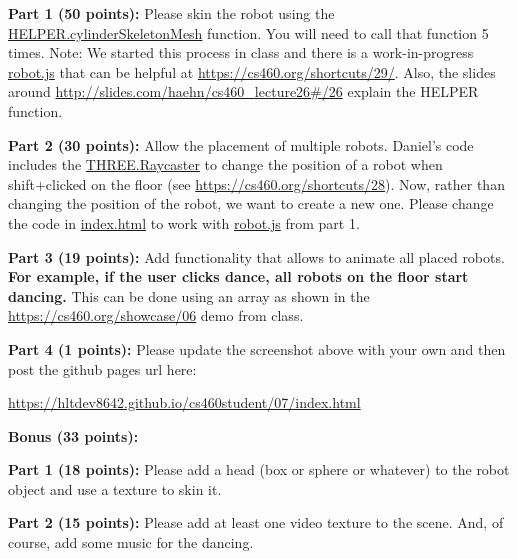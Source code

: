 \documentclass[10pt,oneside,onecolumn,letterpaper]{article}
\begin{document}
\vspace{.5cm}


\noindent\textbf{Part 1 (50 points):} Please skin the robot using the \url{HELPER.cylinderSkeletonMesh} function. You will need to call that function 5 times. Note: We started this process in class and there is a work-in-progress \url{robot.js} that can be helpful at \url{https://cs460.org/shortcuts/29/}. Also, the slides around \url{http://slides.com/haehn/cs460_lecture26#/26} explain the HELPER function.

\vspace{.5cm}

\noindent\textbf{Part 2 (30 points):} Allow the placement of multiple robots. Daniel's code includes the \url{THREE.Raycaster} to change the position of a robot when shift+clicked on the floor (see \url{https://cs460.org/shortcuts/28}). Now, rather than changing the position of the robot, we want to create a new one. Please change the code in \url{index.html} to work with \url{robot.js} from part 1.

\vspace{.5cm}

\noindent\textbf{Part 3 (19 points):} Add functionality that allows to animate all placed robots. \textbf{For example, if the user clicks dance, all robots on the floor start dancing.} This can be done using an array as shown in the \url{https://cs460.org/showcase/06} demo from class.

\vspace{.5cm}

\noindent\textbf{Part 4 (1 points):} Please update the screenshot above with your own and then post the github pages url here:

\vspace{.5cm}

\url{https://hltdev8642.github.io/cs460student/07/index.html}

\vspace{3cm}

\noindent\textbf{Bonus (33 points):}

\vspace{.5cm}

\noindent\textbf{Part 1 (18 points):} Please add a head (box or sphere or whatever) to the robot object and use a texture to skin it.

\vspace{.5cm}

\noindent\textbf{Part 2 (15 points):} Please add at least one video texture to the scene. And, of course, add some music for the dancing.
\end{document}
